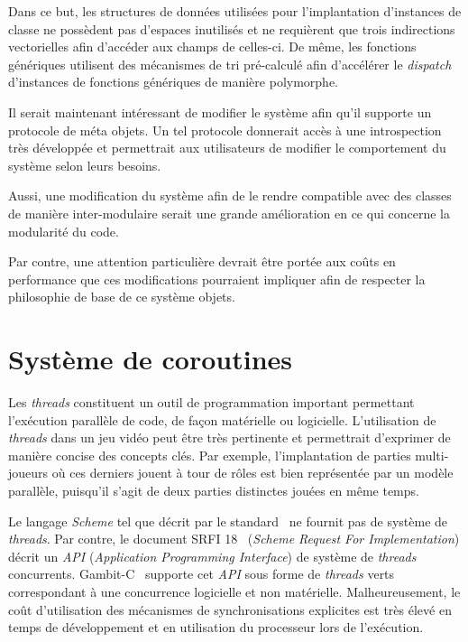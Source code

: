 \documentclass[12pt,twoside,letterpaper,francais]{book}
\newcommand{\Schemelang}{{\textit{Scheme }}}
\begin{document}
Dans ce but, les structures de données utilisées pour l'implantation
d'instances de classe ne possèdent pas d'espaces inutilisés et ne
requièrent que trois indirections vectorielles afin d'accéder aux
champs de celles-ci. De même, les fonctions génériques utilisent des
mécanismes de tri pré-calculé afin d'accélérer le \textit{dispatch}
d'instances de fonctions génériques de manière polymorphe.

Il serait maintenant intéressant de modifier le système afin qu'il
supporte un protocole de méta objets. Un tel protocole donnerait accès
à une introspection très développée et permettrait aux utilisateurs de
modifier le comportement du système selon leurs besoins.

Aussi, une modification du système afin de le rendre compatible avec
des classes de manière inter-modulaire serait une grande amélioration
en ce qui concerne la modularité du code.

Par contre, une attention particulière devrait être portée aux coûts
en performance que ces modifications pourraient impliquer afin de
respecter la philosophie de base de ce système objets.

\clearpage

\chapter{Système de coroutines} \label{Chap:corout}
Les \textit{threads} constituent un outil de programmation important
permettant l'exécution parallèle de code, de façon matérielle ou
logicielle. L'utilisation de \textit{threads} dans un jeu vidéo peut
être très pertinente et permettrait d'exprimer de manière concise des
concepts clés. Par exemple, l'implantation de parties multi-joueurs où
ces derniers jouent à tour de rôles est bien représentée par un modèle
parallèle, puisqu'il s'agit de deux parties distinctes jouées en même
temps.

Le langage \Schemelang tel que décrit par le standard~\cite{R5RS} ne
fournit pas de système de \textit{threads}. Par contre, le document
SRFI 18~\cite{SRFI18} (\textit{Scheme Request For Implementation})
décrit un \textit{API} (\textit{Application Programming Interface}) de
système de \textit{threads} concurrents. Gambit-C~\cite{Gambit4}
supporte cet \textit{API} sous forme de \textit{threads} verts
correspondant à une concurrence logicielle et non
matérielle. Malheureusement, le coût d'utilisation des mécanismes de
synchronisations explicites est très élevé en temps de développement
et en utilisation du processeur lors de l'exécution.
\end{document}
